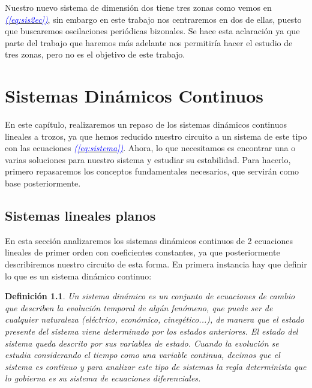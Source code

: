 \documentclass[12pt,a4paper]{report} %
\newtheorem{definicion}{Definición}[chapter] %
\newcommand{\eref}[1]{\hyperref[#1]{\textcolor{blue}{\textit{(\ref*{#1})}}}}
\begin{document}

	
	\vspace{0.5cm}Nuestro nuevo sistema de dimensión dos tiene tres zonas como vemos en \eref{eq:sis2ec}, sin embargo en este trabajo nos centraremos en dos de ellas, puesto que buscaremos oscilaciones periódicas bizonales. Se hace esta aclaración ya que parte del trabajo que haremos más adelante nos permitiría hacer el estudio de tres zonas, pero no es el objetivo de este trabajo.

	
	\chapter{Sistemas Dinámicos Continuos}
	En este capítulo, realizaremos un repaso de los sistemas dinámicos continuos lineales a trozos, ya que hemos reducido nuestro circuito a un sistema de este tipo con las ecuaciones \eref{eq:sistema}. Ahora, lo que necesitamos es encontrar una o varias soluciones para nuestro sistema y estudiar su estabilidad. Para hacerlo, primero repasaremos los conceptos fundamentales necesarios, que servirán como base posteriormente.
	
	\section{Sistemas lineales planos}
	\label{sec:sislinplanos}
	En esta sección analizaremos los sistemas dinámicos continuos de 2 ecuaciones lineales de primer orden con coeficientes constantes, ya que posteriormente describiremos nuestro circuito de esta forma.
	En primera instancia hay que definir lo que es un sistema dinámico continuo:
	
	\vspace{0.5cm}\begin{definicion}
		Un sistema dinámico es un conjunto de ecuaciones de cambio que describen la evolución temporal de algún fenómeno, que puede ser de cualquier naturaleza (eléctrico, económico, cinegético...), de manera que el estado presente del sistema viene determinado por los estados anteriores. El estado del sistema queda descrito por sus variables de estado. Cuando la evolución se estudia considerando el tiempo como una variable 
		continua, decimos que el sistema es continuo y para analizar este tipo de sistemas la regla determinista que lo gobierna es su sistema de ecuaciones diferenciales.
	\end{definicion}
	
\end{document}
